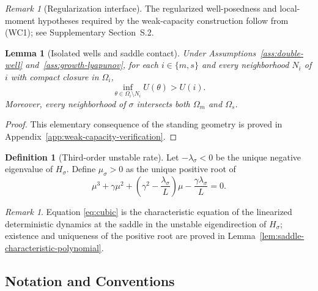 \documentclass[11pt]{article}
\numberwithin{equation}{section}
\theoremstyle{plain}
\newtheorem{lemma}[theorem]{Lemma}
\theoremstyle{definition}
\newtheorem{definition}[theorem]{Definition}
\theoremstyle{remark}
\newtheorem{remark}[theorem]{Remark}
\begin{document}
\begin{remark}[Regularization interface]
The regularized well-posedness and local-moment hypotheses required by the
weak-capacity construction follow from \textup{(WC1)}; see Supplementary
Section~S.2.
\end{remark}



\begin{lemma}[Isolated wells and saddle contact]
\label{lem:derived-double-well-geometry}
Under Assumptions~\ref{ass:double-well} and~\ref{ass:growth-lyapunov}, for each
$i\in\{m,s\}$ and every neighborhood $N_i$ of $i$ with compact closure in
$\Omega_i$,
\begin{equation}
\label{eq:derived-no-low-energy-plateau}
\inf_{\theta\in\Omega_i\setminus N_i}U(\theta)>U(i).
\end{equation}
Moreover, every neighborhood of $\sigma$ intersects both $\Omega_m$ and
$\Omega_s$.
\end{lemma}

\begin{proof}
This elementary consequence of the standing geometry is proved in
Appendix~\ref{app:weak-capacity-verification}.
\end{proof}

\begin{definition}[Third-order unstable rate]
\label{def:unstable-rate}
Let $-\lambda_\sigma<0$ be the unique negative eigenvalue of $H_\sigma$.  Define
$\mu_\sigma>0$ as the unique positive root of
\begin{equation}
\label{eq:cubic}
\mu^3+\gamma\mu^2+\left(\gamma^2-\frac{\lambda_\sigma}{L}\right)\mu
-\frac{\gamma\lambda_\sigma}{L}=0.
\end{equation}
\end{definition}

\begin{remark}
Equation \eqref{eq:cubic} is the characteristic equation of the linearized
deterministic dynamics at the saddle in the unstable eigendirection of
$H_\sigma$; existence and uniqueness of the positive root are proved in
Lemma~\ref{lem:saddle-characteristic-polynomial}.
\end{remark}

\subsection{Notation and Conventions}
\label{sec:notation}
\end{document}

